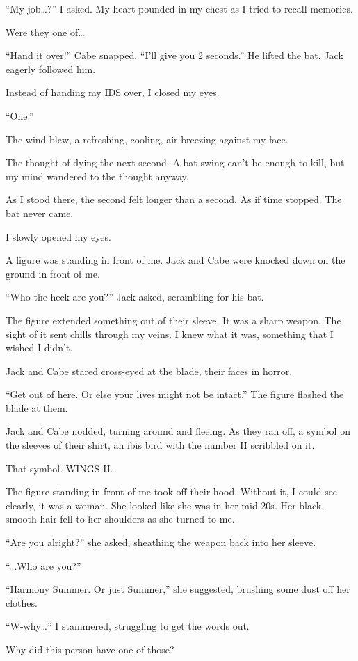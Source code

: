 “My job…?” I asked. My heart pounded in my chest as I tried to recall memories. 

Were they one of…

“Hand it over!” Cabe snapped. “I’ll give you 2 seconds.” He lifted the bat. Jack eagerly followed him.  

Instead of handing my IDS over, I closed my eyes.

“One.”

The wind blew, a refreshing, cooling, air breezing against my face. 

The thought of dying the next second. A bat swing can’t be enough to kill, but my mind wandered to the thought anyway.

As I stood there, the second felt longer than a second. As if time stopped. The bat never came. 

I slowly opened my eyes.

A figure was standing in front of me. Jack and Cabe were knocked down on the ground in front of me.

“Who the heck are you?” Jack asked, scrambling for his bat.

The figure extended something out of their sleeve. It was a sharp weapon. The sight of it sent chills through my veins. I knew what it was, something that I wished I didn’t.

Jack and Cabe stared cross-eyed at the blade, their faces in horror.

“Get out of here. Or else your lives might not be intact.” The figure flashed the blade at them.

Jack and Cabe nodded, turning around and fleeing. As they ran off, a symbol on the sleeves of their shirt, an ibis bird with the number II scribbled on it.

That symbol. WINGS II.

The figure standing in front of me took off their hood. Without it, I could see clearly, it was a woman. She looked like she was in her mid 20s. Her black, smooth hair fell to her shoulders as she turned to me.

“Are you alright?” she asked, sheathing the weapon back into her sleeve.

“...Who are you?”

“Harmony Summer. Or just Summer,” she suggested, brushing some dust off her clothes.

“W-why…” I stammered, struggling to get the words out. 

Why did this person have one of those?

